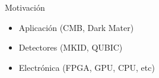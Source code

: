 \documentclass[ignorenonframetext,12pt]{beamer}
\begin{document}
\begin{frame}{Motivación}
	\begin{itemize}
		\item Aplicación (CMB, Dark Mater)
		\item Detectores (MKID, QUBIC)
		\item Electrónica (FPGA, GPU, CPU, etc)
	\end{itemize}

\end{frame}
\end{document}
